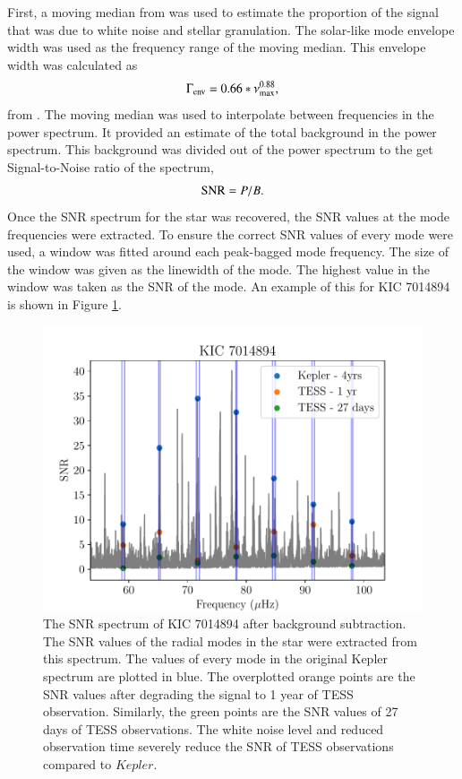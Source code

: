 \documentclass[a4paper,fleqn,usenatbib,useAMS]{mnras}
\newcommand{\numax}{\ensuremath{\nu_{\textrm{max}}}}
\newcommand{\kep}{\ensuremath{Kepler}\:}
\begin{document}
First, a moving median from \citet{davies_asteroseismology_2016} was used to estimate the proportion of the signal that was due to white noise and stellar granulation. The solar-like mode envelope width was used as the frequency range of the moving median. This envelope width was calculated as
\begin{equation}
\Gamma_{\rm env} = 0.66 * \numax^{0.88},
\end{equation}
from \citet{mosser_characterization_2012}. The moving median was used to interpolate between frequencies in the power spectrum. It provided an estimate of the total background in the power spectrum. This background was divided out of the power spectrum to the get Signal-to-Noise ratio of the spectrum,
\begin{equation}
\label{eq:snr}
{\rm SNR} = P/B.
\end{equation}
Once the SNR spectrum for the star was recovered, the SNR values at the mode frequencies were extracted. To ensure the correct SNR values of every mode were used, a window was fitted around each peak-bagged mode frequency. The size of the window was given as the linewidth of the mode. The highest value in the window was taken as the SNR of the mode. An example of this for KIC 7014894 is shown in Figure \ref{snr}.
\begin{figure}
	\centering
	\includegraphics[scale=0.6]{plot4_SNR7014894.pdf}
	\caption{The SNR spectrum of KIC 7014894 after background subtraction. The SNR values of the radial modes in the star were extracted from this spectrum. The values of every mode in the original Kepler spectrum are plotted in blue. The overplotted orange points are the SNR values after degrading the signal to 1 year of TESS observation. Similarly, the green points are the SNR values of 27 days of TESS observations. The white noise level and reduced observation time severely reduce the SNR of TESS observations compared to \kep.}	
	\label{snr}
\end{figure}
\end{document}
